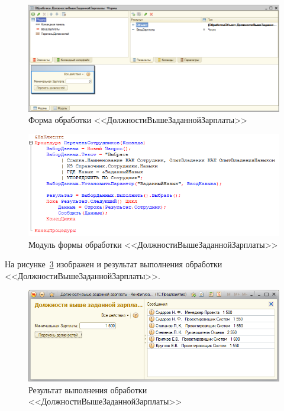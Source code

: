 \begin{figure}[h!]
  \centering
  \includegraphics[width=140mm]{pic/by_min_salary_form}
  \caption{Форма обработки <<ДолжностиВышеЗаданнойЗарплаты>>}
  \label{fig:by_min_salary_form}
\end{figure}

\begin{figure}[h!]
  \centering
  \includegraphics[width=140mm]{pic/employees_by_skill_code}
  \caption{Модуль формы обработки <<ДолжностиВышеЗаданнойЗарплаты>>}
  \label{fig:by_min_salary_code}
\end{figure}

На рисунке~\ref{fig:by_min_salary_results} изображен и результат выполнения
обработки <<ДолжностиВышеЗаданнойЗарплаты>>.
\begin{figure}[h!]
  \centering
  \includegraphics[width=160mm]{pic/by_min_salary_results}
  \caption{Результат выполнения обработки <<ДолжностиВышеЗаданнойЗарплаты>>}
  \label{fig:by_min_salary_results}
\end{figure}


